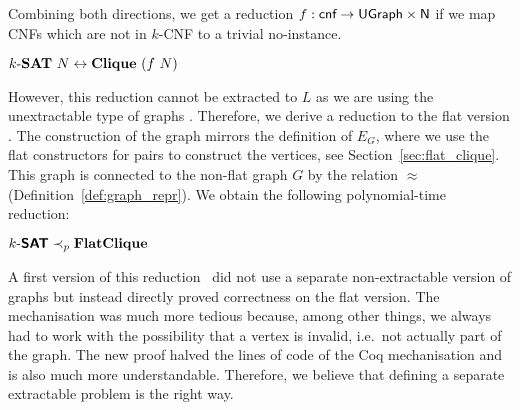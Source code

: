 Combining both directions, we get a reduction $f : \textsf{cnf} \rightarrow \textsf{UGraph} \times \mathsf{N}$ if we map CNFs which are not in $k$-CNF to a trivial no-instance.
\begin{theorem}
  $\text{$k$-\textbf{SAT}{}}~N \leftrightarrow \textbf{Clique}{}~(f~N)$
\end{theorem}

However, this reduction cannot be extracted to $L$ as we are using the unextractable type of graphs \UGraph. 
Therefore, we derive a reduction to the flat version \FlatClique{}. The construction of the graph mirrors the definition of $E_G$, where we use the flat constructors for pairs to construct the vertices, see Section~\ref{sec:flat_clique}. 
This graph is connected to the non-flat graph $G$ by the relation $\approx$ (Definition~\ref{def:graph_repr}). 
We obtain the following polynomial-time reduction:
\begin{theorem}
  $\textsf{$k$-\textbf{SAT}{}} \prec_p{} \textbf{FlatClique}{}$
\end{theorem}

\begin{remark}
  A first version of this reduction~\cite{memo_clique} did not use a separate non-extractable version of graphs but instead directly proved correctness on the flat version. 
  The mechanisation was much more tedious because, among other things, we always had to work with the possibility that a vertex is invalid, i.e.\ not actually part of the graph. 
  The new proof halved the lines of code of the Coq mechanisation and is also much more understandable. Therefore, we believe that defining a separate extractable problem is the right way.
\end{remark}
